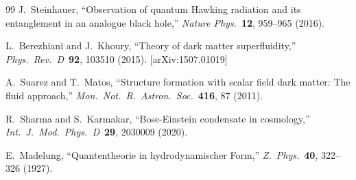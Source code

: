 \documentclass[11pt,a4paper]{article}
\theoremstyle{definition}
\theoremstyle{remark}
\begin{document}
\begin{thebibliography}{99}
J.~Steinhauer, ``Observation of quantum Hawking radiation and its entanglement in an analogue black hole,'' \emph{Nature Phys.}\ \textbf{12}, 959--965 (2016).

L.~Berezhiani and J.~Khoury, ``Theory of dark matter superfluidity,'' \emph{Phys.\ Rev.\ D}\ \textbf{92}, 103510 (2015). [arXiv:1507.01019]

A.~Suarez and T.~Matos, ``Structure formation with scalar field dark matter: The fluid approach,'' \emph{Mon.\ Not.\ R.\ Astron.\ Soc.}\ \textbf{416}, 87 (2011).

R.~Sharma and S.~Karmakar, ``Bose-Einstein condensate in cosmology,'' \emph{Int.\ J.\ Mod.\ Phys.\ D}\ \textbf{29}, 2030009 (2020).

E.~Madelung, ``Quantentheorie in hydrodynamischer Form,'' \emph{Z.\ Phys.}\ \textbf{40}, 322--326 (1927).

\end{thebibliography}
\end{document}
